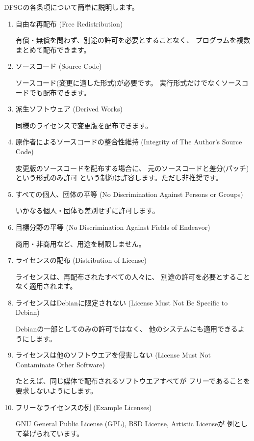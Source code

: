 \documentclass[mingoth,a4paper]{jsarticle}
\begin{document}
DFSGの各条項について簡単に説明します。

\begin{enumerate}
 \item 自由な再配布 (Free Redistribution)

有償・無償を問わず、別途の許可を必要とすることなく、
プログラムを複数まとめて配布できます。

 \item ソースコード (Source Code)

ソースコード(変更に適した形式)が必要です。
実行形式だけでなくソースコードでも配布できます。

 \item 派生ソフトウェア (Derived Works)

同様のライセンスで変更版を配布できます。

 \item 原作者によるソースコードの整合性維持
   (Integrity of The Author's Source Code)

変更版のソースコードを配布する場合に、
元のソースコードと差分(パッチ)という形式のみ許可
という制約は許容します。ただし非推奨です。

 \item すべての個人、団体の平等
   (No Discrimination Against Persons or Groups)

いかなる個人・団体も差別せずに許可します。

 \item 目標分野の平等
   (No Discrimination Against Fields of Endeavor)

商用・非商用など、用途を制限しません。

 \item ライセンスの配布
   (Distribution of License)

ライセンスは、再配布されたすべての人々に、
別途の許可を必要とすることなく適用されます。

 \item ライセンスはDebianに限定されない
   (License Must Not Be Specific to Debian)

Debianの一部としてのみの許可ではなく、
他のシステムにも適用できるようにします。

 \item ライセンスは他のソフトウエアを侵害しない
   (License Must Not Contaminate Other Software)

たとえば、同じ媒体で配布されるソフトウエアすべてが
フリーであることを要求しないようにします。

 \item フリーなライセンスの例
   (Example Licenses)

GNU General Public License (GPL), BSD License, Artistic Licenseが
例として挙げられています。

\end{enumerate}
\end{document}
